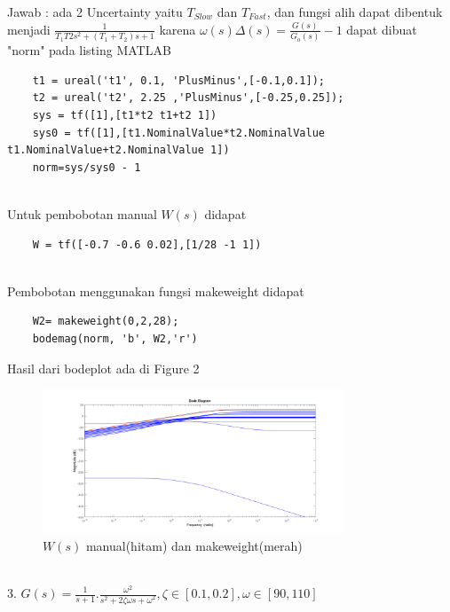 \documentclass[14pt]{article}
\begin{document}
Jawab : ada 2 Uncertainty yaitu $T_{Slow}$ dan $T_{Fast}$, dan fungsi alih dapat dibentuk menjadi $ \frac{1}{T_{1}T{2}s^2 + (T_{1}+T_{2})s + 1}$ karena $\omega(s)\Delta(s)=\frac{G(s)}{G_{o}(s)}-1$ dapat dibuat "norm" pada listing MATLAB
\begin{verbatim}
    t1 = ureal('t1', 0.1, 'PlusMinus',[-0.1,0.1]);
    t2 = ureal('t2', 2.25 ,'PlusMinus',[-0.25,0.25]);
    sys = tf([1],[t1*t2 t1+t2 1])
    sys0 = tf([1],[t1.NominalValue*t2.NominalValue t1.NominalValue+t2.NominalValue 1])
    norm=sys/sys0 - 1
\end{verbatim}\\
Untuk pembobotan manual $W(s)$ didapat
\begin{verbatim}
    W = tf([-0.7 -0.6 0.02],[1/28 -1 1])
\end{verbatim}\\
Pembobotan menggunakan fungsi makeweight didapat
\begin{verbatim}
    W2= makeweight(0,2,28);
    bodemag(norm, 'b', W2,'r')
\end{verbatim}
Hasil dari bodeplot ada di Figure 2
\begin{figure}[h]
    \centering
    \includegraphics[width=90mm]{makeweight2.png}
    \caption{$W(s)$ manual(hitam) dan makeweight(merah) \label{overflow}}
\end{figure}\\
3. $G(s)=\frac{1}{s+1}.\frac{\omega^2}{s^2+2\zeta\omega s+\omega^2},\zeta \in [0.1,0.2],\omega\in[90,110]$\\
\end{document}
